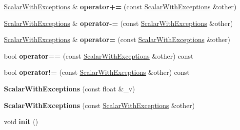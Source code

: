 \begin{DoxyCompactItemize}
\mbox{\label{class_scalar_with_exceptions_ae5484760cf7befc10df2455d56aabec0}} 
\hyperlink{class_scalar_with_exceptions}{Scalar\+With\+Exceptions} \& {\bfseries operator+=} (const \hyperlink{class_scalar_with_exceptions}{Scalar\+With\+Exceptions} \&other)
\item 
\mbox{\label{class_scalar_with_exceptions_a7d64d07dbd3c3455194349592ba60b91}} 
\hyperlink{class_scalar_with_exceptions}{Scalar\+With\+Exceptions} \& {\bfseries operator-\/=} (const \hyperlink{class_scalar_with_exceptions}{Scalar\+With\+Exceptions} \&other)
\item 
\mbox{\label{class_scalar_with_exceptions_a6e16c719e0fca2cbad17deccfa01a229}} 
\hyperlink{class_scalar_with_exceptions}{Scalar\+With\+Exceptions} \& {\bfseries operator=} (const \hyperlink{class_scalar_with_exceptions}{Scalar\+With\+Exceptions} \&other)
\item 
\mbox{\label{class_scalar_with_exceptions_a74db2bf74730e537966b58229f3b4753}} 
bool {\bfseries operator==} (const \hyperlink{class_scalar_with_exceptions}{Scalar\+With\+Exceptions} \&other) const
\item 
\mbox{\label{class_scalar_with_exceptions_a0e6da882af78d0876e40fcac69915a4b}} 
bool {\bfseries operator!=} (const \hyperlink{class_scalar_with_exceptions}{Scalar\+With\+Exceptions} \&other) const
\item 
\mbox{\label{class_scalar_with_exceptions_a7c89b3add704ac2ac549463961a7f3d2}} 
{\bfseries Scalar\+With\+Exceptions} (const float \&\+\_\+v)
\item 
\mbox{\label{class_scalar_with_exceptions_a674411859befe8639d1b679d41114f29}} 
{\bfseries Scalar\+With\+Exceptions} (const \hyperlink{class_scalar_with_exceptions}{Scalar\+With\+Exceptions} \&other)
\item 
\mbox{\label{class_scalar_with_exceptions_afa23d0c7616b5017d4793b27322a2fba}} 
void {\bfseries init} ()
\item 
\mbox{\label{class_scalar_with_exceptions_a8f18cff93c31ccfb85af389d24c00ea2}} 

\end{DoxyCompactItemize}
